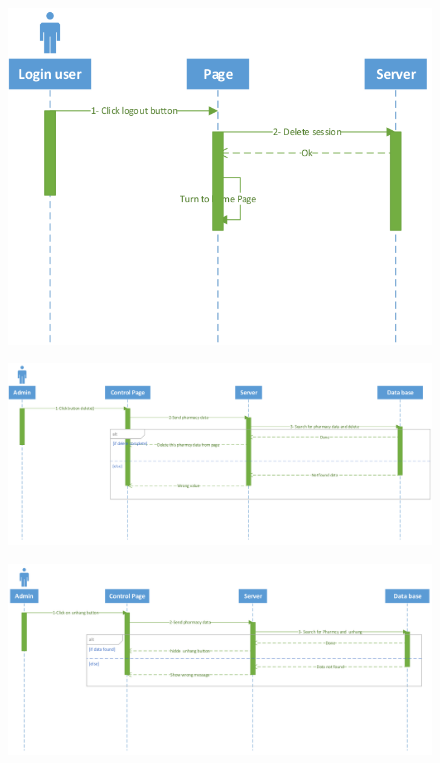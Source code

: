 \documentclass[]{article}
\begin{document}
\begin{figure}[H]
\centering
\includegraphics[scale=0.3]{./sequence/04}
\end{figure}
\begin{figure}[H]
\centering
\includegraphics[scale=0.28]{./sequence/05}
\end{figure}
\begin{figure}[H]
\centering
\includegraphics[scale=0.3]{./sequence/06}
\end{figure}
\end{document}
